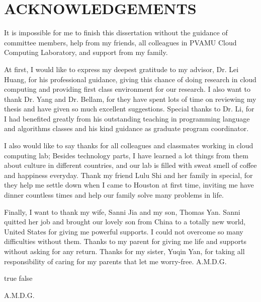 %
%
%


\chapter*{ACKNOWLEDGEMENTS}

It is impossible for me to finish this dissertation without the guidance of committee members, help from my friends, all colleagues in PVAMU Cloud Computing Laboratory, and support from my family.

At first, I would like to express my deepest gratitude to my advisor, Dr. Lei Huang, for his professional guidance, giving this chance of doing research in cloud computing and providing first class environment for our research. I also want to thank Dr. Yang and Dr. Bellam, for they have spent lots of time on reviewing my thesis and have given so much excellent suggestions. Special thanks to Dr. Li, for I had benefited greatly from his outstanding teaching in programming language and algorithms classes and his kind guidance as graduate program coordinator.

I also would like to say thanks for all colleagues and classmates working in cloud computing lab; Besides technology parts, I have learned a lot things from them about culture in different countries, and our lab is filled with sweat smell of coffee and happiness everyday. Thank my friend Lulu Shi and her family in special, for they help me settle down when I came to Houston at first time, inviting me have dinner countless times and help our family solve many problems in life.

Finally, I want to thank my wife, Sanni Jia and my son, Thomas Yan. Sanni quitted her job and brought our lovely son from China to a totally new world, United States for giving me powerful supports. I could not overcome so many difficulties without them. Thanks to my parent for giving me life and supports without asking for any return. Thanks for my sister, Yuqin Yan, for taking all responsibility of caring for my parents that let me worry-free. A.M.D.G.  


\pagebreak{}

\ifx true false
\vspace*{\fill}
\begin{center}
A.M.D.G.
\end{center}
\vspace*{\fill}
\pagebreak{}
\fi
